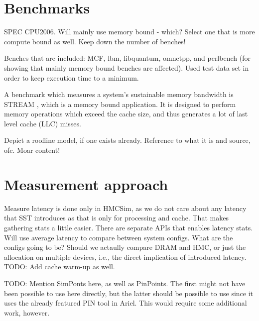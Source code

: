 
\section{Benchmarks}
SPEC CPU2006. Will mainly use memory bound - which? Select one that is more compute bound as well. Keep down the number of benches!
\bigskip

Benches that are included:
MCF, lbm, libquantum, omnetpp, and perlbench (for showing that mainly memory bound benches are affected). Used test data set in order to keep execution time to a minimum.

A benchmark which measures a system's sustainable memory bandwidth is STREAM \cite{mccalpin1995memory}, which is a memory bound application. It is designed to perform memory operations which exceed the cache size, and thus generates a lot of last level cache (LLC) misses.

Depict a roofline model, if one exists already. Reference to what it is and source, ofc. Moar content!


\section{Measurement approach}
Measure latency is done only in HMCSim, as we do not care about any latency that SST introduces as that is only for processing and cache. That makes gathering stats a little easier. There are separate APIs that enables latency stats. Will use average latency to compare between system configs. What are the configs going to be? Should we actaully compare DRAM and HMC, or just the allocation on multiple devices, i.e., the direct implication of introduced latency. TODO: Add cache warm-up as well.

TODO: Mention SimPonts here, as well as PinPoints. The first might not have been possible to use here directly, but the latter should be possible to use since it uses the already featured PIN tool in Ariel. This would require some additional work, however. 
